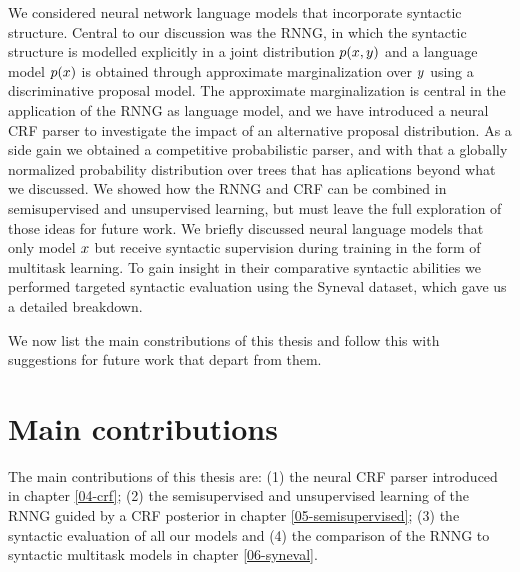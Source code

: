 We considered neural network language models that incorporate syntactic structure. Central to our discussion was the RNNG, in which the syntactic structure is modelled explicitly in a joint distribution $p( x, y )$ and a language model $p(x)$ is obtained through approximate marginalization over $y$ using a discriminative proposal model. The approximate marginalization is central in the application of the RNNG as language model, and we have introduced a neural CRF parser to investigate the impact of an alternative proposal distribution. As a side gain we obtained a competitive probabilistic parser, and with that a globally normalized probability distribution over trees that has aplications beyond what we discussed. We showed how the RNNG and CRF can be combined in semisupervised and unsupervised learning, but must leave the full exploration of those ideas for future work. We briefly discussed neural language models that only model $x$ but receive syntactic supervision during training in the form of multitask learning. To gain insight in their comparative syntactic abilities we performed targeted syntactic evaluation using the Syneval dataset, which gave us a detailed breakdown.

We now list the main constributions of this thesis and follow this with suggestions for future work that depart from them.

\section{Main contributions}
  The main contributions of this thesis are: (1) the neural CRF parser introduced in chapter \ref{04-crf}; (2) the semisupervised and unsupervised learning of the RNNG guided by a CRF posterior in chapter \ref{05-semisupervised}; (3) the syntactic evaluation of all our models and (4) the comparison of the RNNG to syntactic multitask models in chapter \ref{06-syneval}.

